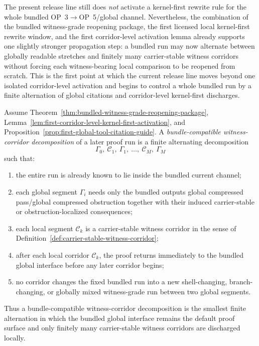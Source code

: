 \begin{remark}
\label{rem:status-of-the-first-corridor-to-bundle-propagation-step}
The present release line still does \emph{not} activate a kernel-first rewrite rule for the whole bundled OP~3$\to$OP~5/global channel. Nevertheless, the combination of the bundled witness-grade reopening package, the first licensed local kernel-first rewrite window, and the first corridor-level activation lemma already supports one slightly stronger propagation step: a bundled run may now alternate between globally readable stretches and finitely many carrier-stable witness corridors without forcing each witness-bearing local comparison to be reopened from scratch. This is the first point at which the current release line moves beyond one isolated corridor-level activation and begins to control a whole bundled run by a finite alternation of global citations and corridor-level kernel-first discharges.
\end{remark}

\begin{definition}
\label{def:bundle-compatible-witness-corridor-decomposition}
Assume Theorem~\ref{thm:bundled-witness-grade-reopening-package}, Lemma~\ref{lem:first-corridor-level-kernel-first-activation}, and Proposition~\ref{prop:first-global-tool-citation-guide}. A \emph{bundle-compatible witness-corridor decomposition} of a later proof run is a finite alternating decomposition
\[
\Gamma_0,\ \mathcal C_1,\ \Gamma_1,\ \ldots,\ \mathcal C_M,\ \Gamma_M
\]
such that:
\begin{enumerate}[leftmargin=2em,label=(\roman*)]
\item the entire run is already known to lie inside the bundled current channel;
\item each global segment $\Gamma_i$ needs only the bundled outputs global compressed pass/global compressed obstruction together with their induced carrier-stable or obstruction-localized consequences;
\item each local segment $\mathcal C_k$ is a carrier-stable witness corridor in the sense of Definition~\ref{def:carrier-stable-witness-corridor};
\item after each local corridor $\mathcal C_k$, the proof returns immediately to the bundled global interface before any later corridor begins;
\item no corridor changes the fixed bundled run into a new shell-changing, branch-changing, or globally mixed witness-grade run between two global segments.
\end{enumerate}
Thus a bundle-compatible witness-corridor decomposition is the smallest finite alternation in which the bundled global interface remains the default proof surface and only finitely many carrier-stable witness corridors are discharged locally.
\end{definition}

